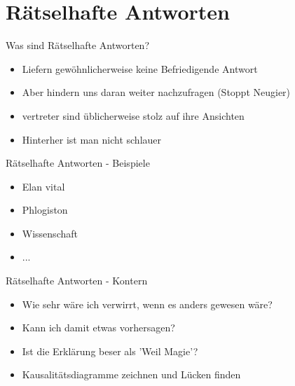 \section{Rätselhafte Antworten}

\begin{frame}[c]{Was sind Rätselhafte Antworten?}
    \Large
    \begin{itemize}[<+->]
    \item Liefern gewöhnlicherweise keine Befriedigende Antwort
    \item Aber hindern uns daran weiter nachzufragen (Stoppt Neugier)
    \item vertreter sind üblicherweise stolz auf ihre Ansichten
    \item Hinterher ist man nicht schlauer
    \end{itemize}

\end{frame}




\begin{frame}[c]{Rätselhafte Antworten - Beispiele}
    \Large
    \begin{itemize}[<+->]
    \item Elan vital
    \newline
    \item Phlogiston
    \newline
    \item Wissenschaft
    \newline
    \item ...
    \end{itemize}
\end{frame}


\begin{frame}[c]{Rätselhafte Antworten - Kontern}
    \Large
    \begin{itemize}[<+->]
    \item Wie sehr wäre ich verwirrt, wenn es anders gewesen wäre?
    \newline
    \item Kann ich damit etwas vorhersagen?
    \newline
    \item Ist die Erklärung beser als 'Weil Magie'?
    \newline
    \item Kausalitätsdiagramme zeichnen und Lücken finden
    \end{itemize}
\end{frame}


